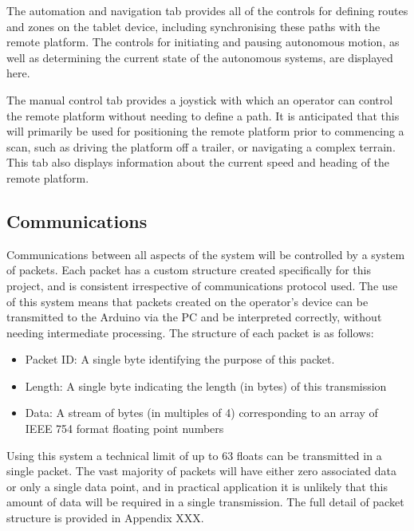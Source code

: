 \documentclass[main.tex]{subfiles}
\begin{document}
The automation and navigation tab provides all of the controls for defining routes and zones on the tablet device, including synchronising these paths with the remote platform. The controls for initiating and pausing autonomous motion, as well as determining the current state of the autonomous systems, are displayed here.

The manual control tab provides a joystick with which an operator can control the remote platform without needing to define a path. It is anticipated that this will primarily be used for positioning the remote platform prior to commencing a scan, such as driving the platform off a trailer, or navigating a complex terrain. This tab also displays information about the current speed and heading of the remote platform. 



\subsection{Communications}
Communications between all aspects of the system will be controlled by a system of packets. Each packet has a custom structure created specifically for this project, and is consistent irrespective of communications protocol used. The use of this system means that packets created on the operator’s device can be transmitted to the Arduino via the PC and be interpreted correctly, without needing intermediate processing. The structure of each packet is as follows:
\begin{itemize}
\item Packet ID: A single byte identifying the purpose of this packet.
\item Length: A single byte indicating the length (in bytes) of this transmission
\item Data: A stream of bytes (in multiples of 4) corresponding to an array of IEEE 754 format floating point numbers
\end{itemize}
Using this system a technical limit of up to 63 floats can be transmitted in a single packet. The vast majority of packets will have either zero associated data or only a single data point, and in practical application it is unlikely that this amount of data will be required in a single transmission. The full detail of packet structure is provided in Appendix XXX. 
\end{document}
